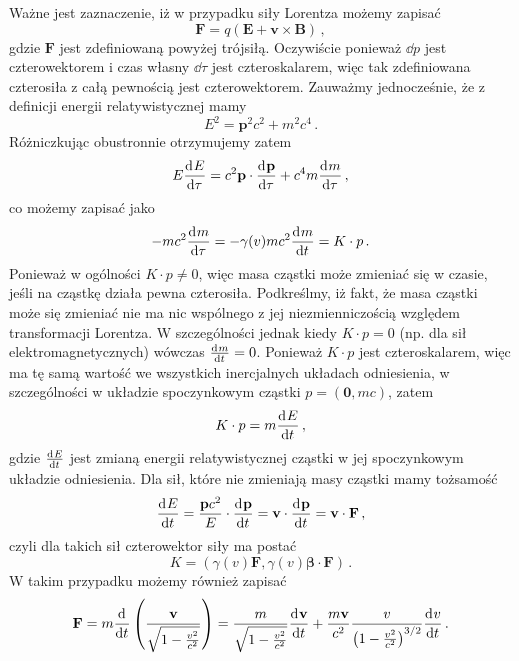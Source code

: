 \documentclass[../main.tex]{subfiles}
\begin{document}
Ważne jest zaznaczenie, iż w przypadku siły Lorentza możemy zapisać
\begin{equation*}
    \mathbf{F}=q(\mathbf{E}+\mathbf{v}\times\mathbf{B})\,,
\end{equation*}
gdzie \(\mathbf{F}\) jest zdefiniowaną powyżej trójsiłą. Oczywiście ponieważ \(\dd{p}\) jest czterowektorem i czas własny \(\dd{\tau}\) jest czteroskalarem, więc tak zdefiniowana czterosiła z całą pewnością jest czterowektorem. Zauważmy jednocześnie, że z definicji energii relatywistycznej mamy
\begin{equation*}
    E^2=\mathbf{p}^2c^2+m^2c^4\,.
\end{equation*}
Różniczkując obustronnie otrzymujemy zatem
\begin{equation*}
    E\dv[]{E}{\tau}=c^2\mathbf{p}\cdot\dv[]{\mathbf{p}}{\tau}+c^4m\dv[]{m}{\tau}\,,
\end{equation*}
co możemy zapisać jako
\begin{equation*}
    -mc^2\dv[]{m}{\tau}=-\gamma(v)mc^2\dv[]{m}{t}=K\cdot p\,.
\end{equation*}
Ponieważ w ogólności \(K\cdot p\neq 0\), więc masa cząstki może zmieniać się w czasie, jeśli na cząstkę działa pewna czterosiła. Podkreślmy, iż fakt, że masa cząstki może się zmieniać nie ma nic wspólnego z jej niezmienniczością względem transformacji Lorentza. W szczególności jednak kiedy \(K\cdot p= 0\) (np. dla sił elektromagnetycznych) wówczas \(\dv[]{m}{t}=0\). Ponieważ \(K\cdot p\) jest czteroskalarem, więc ma tę samą wartość we wszystkich inercjalnych układach odniesienia, w szczególności w układzie spoczynkowym cząstki \(p=(\mathbf{0},mc)\), zatem
\begin{equation*}
    K\cdot p=m\dv[]{E}{t}\,,
\end{equation*}
gdzie \(\dv[]{E}{t}\) jest zmianą energii relatywistycznej cząstki w jej spoczynkowym układzie odniesienia.
Dla sił, które nie zmieniają masy cząstki mamy tożsamość
\begin{equation*}
    \dv[]{E}{t}=\frac{\mathbf{p}c^2}{E}\cdot\dv[]{\mathbf{p}}{t}=\mathbf{v}\cdot\dv[]{\mathbf{p}}{t}=\mathbf{v}\cdot\mathbf{F}\,,
\end{equation*}
czyli dla takich sił czterowektor siły ma postać
\begin{equation*}
    K=\left(\gamma(v)\mathbf{F},\gamma(v)\boldsymbol{\beta}\cdot\mathbf{F}\right)\,.
\end{equation*}
W takim przypadku możemy również zapisać
\begin{equation*}
    \mathbf{F}=m\dv[]{}{t}\left(\frac{\mathbf{v}}{\sqrt{1-\frac{v^2}{c^2}}}\right)=\frac{m}{\sqrt{1-\frac{v^2}{c^2}}}\dv[]{\mathbf{v}}{t}+\frac{m\mathbf{v}}{c^2}\frac{v}{\left(1-\frac{v^2}{c^2}\right)^{3/2}}\dv[]{v}{t}\,.
\end{equation*}
\end{document}
